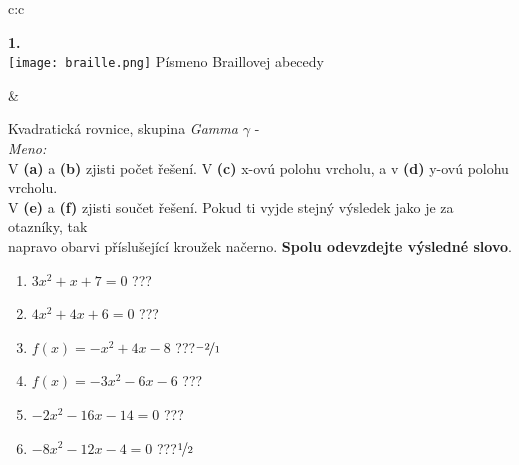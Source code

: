\documentclass[10pt]{report}
\begin{document}
\begin{tabular}{c:c}
\begin{minipage}[c][99mm][t]{0.49\linewidth}
\begin{center}
\begin{minipage}{0.20\linewidth}
\begin{center}
{\Huge\bfseries 1.} \\[2mm]
\texttt{[image: braille.png]}
{\small Písmeno Braillovej abecedy}
\end{center}
\end{minipage}
\end{center}
\end{minipage}
&
\begin{minipage}[c][99mm][t]{0.49\linewidth}
\begin{center}
\vspace{7mm}
{\huge Kvadratická rovnice, skupina \textit{Gamma $\gamma$} -}\\[4.5mm]
\textit{Meno:}\phantom{xxxxxxxxxxxxxxxxxxxxxxxxxxxxxxxxxxxxxxxxxxxxxxxxxxxxxxxxxxxxxxxxx}\\[3.5mm]
V \textbf{(a)} a \textbf{(b)} zjisti počet řešení. V \textbf{(c)} x-ovú polohu vrcholu, a v \textbf{(d)} y-ovú polohu vrcholu.\\V \textbf{(e)} a \textbf{(f)} zjisti součet řešení. Pokud ti vyjde stejný výsledek jako je za otazníky, tak\\napravo obarvi příslušející kroužek načerno. \textbf{Spolu odevzdejte výsledné slovo}.\\[3mm]
\begin{minipage}{0.77\linewidth}
\begin{center}
\begin{varwidth}{\textwidth}
\begin{enumerate}
\large
\item $3x^2+x+7=0$\quad \dotfill\; ???\;\dotfill {}
\item $4x^2+4x+6=0$\quad \dotfill\; ???\;\dotfill {}
\item $f(x)=-x^2+4x-8$\quad \dotfill\; ???\;\dotfill \quad $\nicefrac{-2}{1}$
\item $f(x)=-3x^2-6x-6$\quad \dotfill\; ???\;\dotfill {}
\item $-2x^2-16x-14=0$\quad \dotfill\; ???\;\dotfill {}
\item $-8x^2-12x-4=0$\quad \dotfill\; ???\;\dotfill \quad $\nicefrac{1}{2}$
\end{enumerate}
\end{varwidth}
\end{center}
\end{minipage}
\begin{minipage}{0.20\linewidth}
\begin{center}

\end{center}
\end{minipage}
\end{center}
\end{minipage}
\end{tabular}
\end{document}
